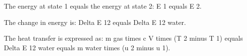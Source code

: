 The energy at state 1 equals the energy at state 2:  
E 1 equals E 2.  

The change in energy is:  
Delta E 12 equals Delta E 12 water.  

The heat transfer is expressed as:  
m gas times c V times (T 2 minus T 1) equals Delta E 12 water equals m water times (u 2 minus u 1).